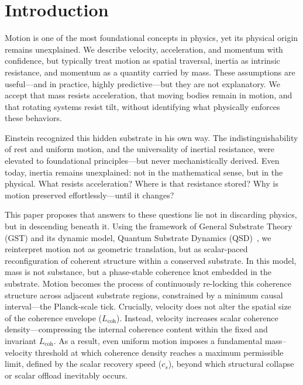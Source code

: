 \documentclass[preprints,article,submit,pdftex,moreauthors]{Definitions/mdpi}
\begin{document}

\section{Introduction}
Motion is one of the most foundational concepts in physics, yet its physical origin remains unexplained. We describe velocity, acceleration, and momentum with confidence, but typically treat motion as spatial traversal, inertia as intrinsic resistance, and momentum as a quantity carried by mass. These assumptions are useful—and in practice, highly predictive—but they are not explanatory. We accept that mass resists acceleration, that moving bodies remain in motion, and that rotating systems resist tilt, without identifying what physically enforces these behaviors.

Einstein recognized this hidden substrate in his own way. The indistinguishability of rest and uniform motion, and the universality of inertial resistance, were elevated to foundational principles—but never mechanistically derived. Even today, inertia remains unexplained: not in the mathematical sense, but in the physical. What resists acceleration? Where is that resistance stored? Why is motion preserved effortlessly—until it changes?

This paper proposes that answers to these questions lie not in discarding physics, but in descending beneath it. Using the framework of General Substrate Theory (GST) and its dynamic model, Quantum Substrate Dynamics (QSD)~\cite{bush2025,bush-planck-2025,bush-coherence,bush-planck-ep}, we reinterpret motion not as geometric translation, but as scalar-paced reconfiguration of coherent structure within a conserved substrate. In this model, mass is not substance, but a phase-stable coherence knot embedded in the substrate. Motion becomes the process of continuously re-locking this coherence structure across adjacent substrate regions, constrained by a minimum causal interval—the Planck-scale tick. Crucially, velocity does not alter the spatial size of the coherence envelope ($L_{\text{coh}}$). Instead, velocity increases scalar coherence density—compressing the internal coherence content within the fixed and invariant $L_{\text{coh}}$. As a result, even uniform motion imposes a fundamental mass–velocity threshold at which coherence density reaches a maximum permissible limit, defined by the scalar recovery speed ($c_s$), beyond which structural collapse or scalar offload inevitably occurs. 
\end{document}
